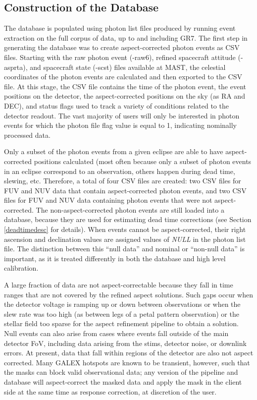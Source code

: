 \documentclass[5p]{elsarticle}
\begin{document}
\subsection{Construction of the Database}
The database is populated using photon list files produced by running event extraction on the full corpus of data, up to and including GR7.  The first step in generating the database was to create aspect-corrected photon events as CSV files.  Starting with the raw photon event (-raw6), refined spacecraft attitude (-asprta), and spacecraft state (-scst) files available at MAST, the celestial coordinates of the photon events are calculated and then exported to the CSV file. At this stage, the CSV file contains the time of the photon event, the event positions on the detector, the aspect-corrected positions on the sky (as RA and DEC), and status flags used to track a variety of conditions related to the detector readout. The vast majority of users will only be interested in photon events for which the photon file flag value is equal to 1, indicating nominally processed data.

Only a subset of the photon events from a given eclipse are able to have aspect-corrected positions calculated (most often because only a subset of photon events in an eclipse correspond to an observation, others happen during dead time, slewing, etc.  Therefore, a total of four CSV files are created: two CSV files for FUV and NUV data that contain aspect-corrected photon events, and two CSV files for FUV and NUV data containing photon events that were not aspect-corrected. The non-aspect-corrected photon events are still loaded into a database, because they are used for estimating dead time corrections (see Section \ref{deadtimedesc} for details). When events cannot be aspect-corrected, their right ascension and declination values are assigned values of \emph{NULL} in the photon list file. The distinction between this ``null data'' and nominal or ``non-null data'' is important, as it is treated differently in both the database and high level calibration.

A large fraction of data are not aspect-correctable because they fall in time ranges that are not covered by the refined aspect solutions. Such gaps occur when the detector voltage is ramping up or down between observations or when the slew rate was too high (as between legs of a petal pattern observation) or the stellar field too sparse for the aspect refinement pipeline to obtain a solution. Null events can also arise from cases where events fall outside of the main detector FoV, including data arising from the stims, detector noise, or downlink errors. At present, data that fall within regions of the detector are also not aspect corrected. Many GALEX hotspots are known to be transient, however, such that the masks can block valid observational data; any version of the pipeline and database will aspect-correct the masked data and apply the mask in the client side at the same time as response correction, at discretion of the user.
\end{document}
